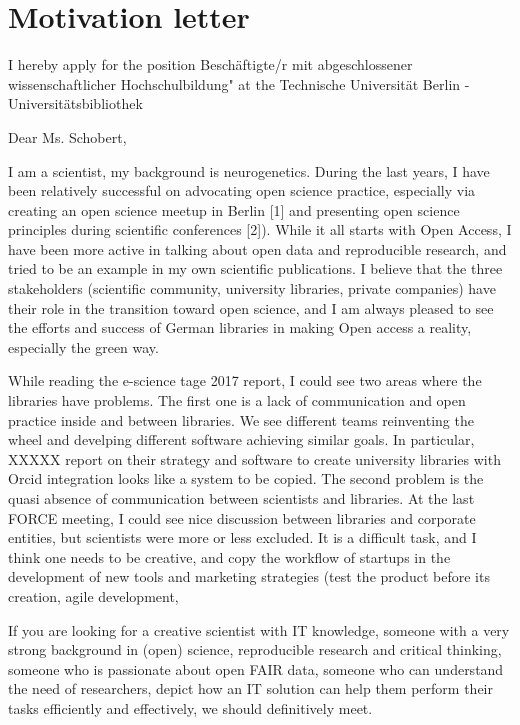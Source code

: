 \section* {Motivation letter}

I hereby apply for the position Besch\"{a}ftigte/r mit abgeschlossener wissenschaftlicher Hochschulbildung" at the Technische Universit\"{a}t Berlin - Universit\"{a}tsbibliothek
\vspace {0.5cm} 

Dear Ms. Schobert,

I am a scientist, my background is neurogenetics. During the last years, I have been relatively successful on advocating open science practice, especially via creating an open science meetup in Berlin [1] and presenting open science principles during scientific conferences [2]). While it all starts with Open Access, I have been more active in talking about open data and reproducible research, and tried to be an example in my own scientific publications. I believe that the three stakeholders (scientific community, university libraries, private companies) have their role in the transition toward open science, and I am always pleased to see the efforts and success of German libraries in making Open access a reality, especially the green way.

While reading the e-science tage 2017 report, I could see two areas where the libraries have problems. The first one is a lack of communication and open practice inside and between libraries. We see different teams reinventing the wheel and develping different software achieving similar goals. In particular, XXXXX report on their strategy and software to create university libraries with Orcid integration looks like a system to be copied. The second problem is the quasi absence of communication between scientists and libraries. At the last FORCE meeting, I could see nice discussion between libraries and corporate entities, but scientists were more or less excluded. It is a difficult task, and I think one needs to be creative, and copy the workflow of startups in the development of new tools and marketing strategies (test the product before its creation, agile development, 

If you are looking for a creative scientist with IT knowledge, someone with a very strong background in (open) science, reproducible research and critical thinking, someone who is passionate about open FAIR data, someone who can understand the need of researchers, depict how an IT solution can help them perform their tasks efficiently and effectively, we should definitively meet.


